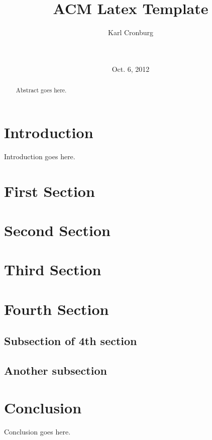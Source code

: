 \documentclass{acm_proc_article-sp}
\begin{document}
\title{ACM Latex Template}

\author{
  \alignauthor
  Karl Cronburg                   \\
   \\
         \\
}
\date{Oct. 6, 2012}

\maketitle

\begin{abstract}
Abstract goes here.
\end{abstract}

\section{Introduction}
Introduction goes here.

\section{First Section}

\section{Second Section}

\section{Third Section}

\section{Fourth Section}

\subsection{Subsection of 4th section}
\subsection{Another subsection}

\section{Conclusion}
Conclusion goes here.

\begin{biblist}
\end{biblist}

\balancecolumns
\end{document}
